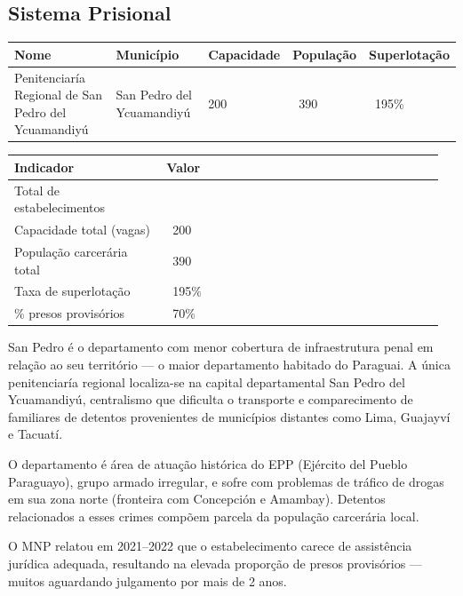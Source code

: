 \subsection{Sistema Prisional}



{\small
\setlength{\tabcolsep}{3pt}
\renewcommand{\arraystretch}{1.12}
{\small
\begin{tabularx}{\linewidth}{lXXXX}
\toprule
Nome & Município & Capacidade & População & Superlotação \\
\midrule
Penitenciaría Regional de San Pedro del Ycuamandiyú & San Pedro del Ycuamandiyú & 200 & ~390 & ~195\% \\
\bottomrule
\end{tabularx}
}
}


{\small
\setlength{\tabcolsep}{3pt}
\renewcommand{\arraystretch}{1.12}
\begin{tabularx}{\linewidth}{>{\raggedright\arraybackslash}p{0.34\linewidth} >{\raggedright\arraybackslash}p{0.62\linewidth}}
\toprule
Indicador & Valor \\
\midrule
Total de estabelecimentos & 1 \\
Capacidade total (vagas) & ~200 \\
População carcerária total & ~390 \\
Taxa de superlotação & ~195\% \\
\% presos provisórios & ~70\% \\
\bottomrule
\end{tabularx}
}


San Pedro é o departamento com menor cobertura de infraestrutura penal em relação ao seu território --- o maior departamento habitado do Paraguai. A única penitenciaría regional localiza-se na capital departamental San Pedro del Ycuamandiyú, centralismo que dificulta o transporte e comparecimento de familiares de detentos provenientes de municípios distantes como Lima, Guajayví e Tacuatí.

O departamento é área de atuação histórica do EPP (Ejército del Pueblo Paraguayo), grupo armado irregular, e sofre com problemas de tráfico de drogas em sua zona norte (fronteira com Concepción e Amambay). Detentos relacionados a esses crimes compõem parcela da população carcerária local.

O MNP relatou em 2021--2022 que o estabelecimento carece de assistência jurídica adequada, resultando na elevada proporção de presos provisórios --- muitos aguardando julgamento por mais de 2 anos.

